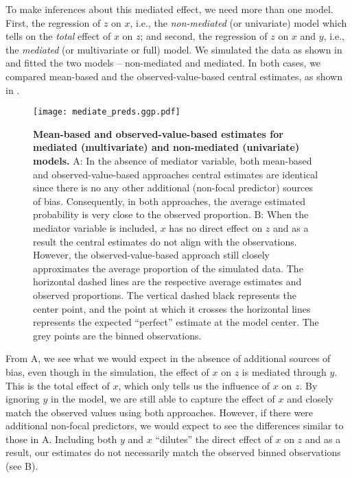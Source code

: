 To make inferences about this mediated effect, we need more than one model. First, the regression of $z$ on $x$, i.e., the \emph{non-mediated} (or univariate) model which tells on the \emph{total} effect of $x$ on $z$; and second, the regression of $z$ on $x$ and $y$, i.e., the \emph{mediated} (or multivariate or full) model. We simulated the data as shown in  and fitted the two models -- non-mediated and mediated. In both cases, we compared mean-based and the observed-value-based central estimates, as shown in .

\begin{figure}
\begin{center}
\texttt{[image: mediate\_preds.ggp.pdf]}
\end{center}
\caption{{\bf Mean-based and observed-value-based estimates for mediated (multivariate) and non-mediated (univariate) models.} A: In the absence of mediator variable, both mean-based and observed-value-based approaches central estimates are identical since there is no any other additional (non-focal predictor) sources of bias. Consequently, in both approaches, the average estimated probability is very close to the observed proportion. B: When the mediator variable is included,  $x$ has no direct effect on $z$ and as a result the central estimates do not align with the observations. However, the observed-value-based approach still closely approximates the average proportion of the simulated data. The horizontal dashed lines are the respective average estimates and observed proportions. The vertical dashed black represents the center point, and the point at which it crosses the horizontal lines represents the expected ``perfect'' estimate at the model center. The grey points are the binned observations.}
\label{fig:pred_mediated_plots}
\end{figure}

From A, we see what we would expect in the absence of additional sources of bias, even though in the simulation, the effect of $x$ on $z$ is mediated through $y$. This is the total effect of $x$, which only tells us the influence of $x$ on $z$. By ignoring $y$ in the model, we are still able to capture the effect of $x$ and closely match the observed values using both approaches. However, if there were additional non-focal predictors, we would expect to see the differences similar to those in A. Including both $y$ and $x$ ``dilutes'' the direct effect of $x$ on $z$ and as a result, our estimates do not necessarily match the observed binned observations (see B).

